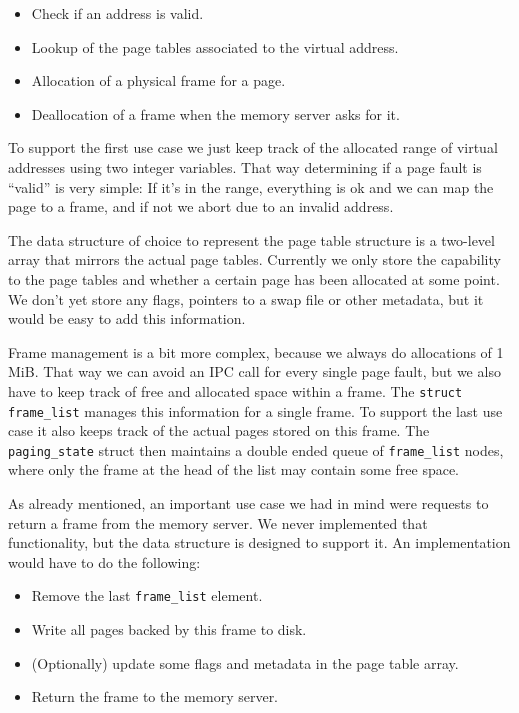 \documentclass[a4paper,10pt]{article}
\begin{document}
\begin{itemize}
 \item Check if an address is valid.
 \item Lookup of the page tables associated to the virtual address.
 \item Allocation of a physical frame for a page.
 \item Deallocation of a frame when the memory server asks for it.
\end{itemize}

To support the first use case we just keep track of the allocated range of virtual addresses using two integer variables.
That way determining if a page fault is ``valid'' is very simple: 
If it's in the range, everything is ok and we can map the page to a frame, and if not we abort due to an invalid address.

The data structure of choice to represent the page table structure is a two-level array that mirrors the actual page tables.
Currently we only store the capability to the page tables and whether a certain page has been allocated at some point.
We don't yet store any flags, pointers to a swap file or other metadata, but it would be easy to add this information.

Frame management is a bit more complex, because we always do allocations of 1 MiB.
That way we can avoid an IPC call for every single page fault, but we also have to keep track of free and allocated space within a frame.
The \lstinline!struct frame_list! manages this information for a single frame.
To support the last use case it also keeps track of the actual pages stored on this frame.
The \lstinline!paging_state! struct then maintains a double ended queue of \lstinline!frame_list! nodes, where only the frame at the head of the list may contain some free space.

As already mentioned, an important use case we had in mind were requests to return a frame from the memory server.
We never implemented that functionality, but the data structure is designed to support it.
An implementation would have to do the following:
\begin{itemize}
 \item Remove the last \lstinline!frame_list! element.
 \item Write all pages backed by this frame to disk.
 \item (Optionally) update some flags and metadata in the page table array.
 \item Return the frame to the memory server.
\end{itemize}
\end{document}
